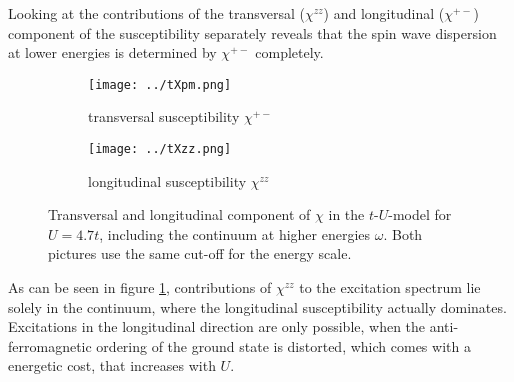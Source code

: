 Looking at the contributions of the transversal ($\chi^{zz}$) and longitudinal ($\chi^{+-}$) component of the susceptibility separately reveals 
that the spin wave dispersion at lower energies is determined by $\chi^{+-}$ completely.
\begin{figure}
 \centering
 \begin{subfigure}{.49\linewidth}
\texttt{[image: ../tXpm.png]}
  \caption{transversal susceptibility $\chi^{+-}$}
 \end{subfigure}
\begin{subfigure}{.49\linewidth}
 \texttt{[image: ../tXzz.png]}
 \caption{longitudinal susceptibility $\chi^{zz}$}
\end{subfigure}
\caption{Transversal and longitudinal component of $\chi$ in the $t$-$U$-model for $U=4.7t$, including the continuum at higher energies $\omega$. 
	 Both pictures use the same cut-off for the energy scale.}
	 \label{Xcomponents}
\end{figure}
%
As can be seen in figure \ref{Xcomponents}, contributions of $\chi^{zz}$ to the excitation spectrum lie solely in the continuum,
where the longitudinal susceptibility actually dominates.
Excitations in the longitudinal direction are only possible, when the anti-ferromagnetic ordering of the ground state 
is distorted, which comes with a energetic cost, that increases with $U$.











 

%
%





